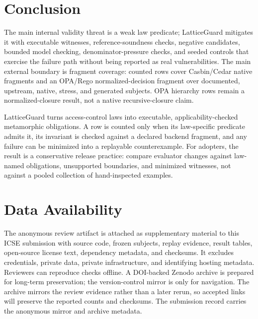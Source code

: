 \documentclass[10pt,conference]{IEEEtran}
\begin{document}
\section{Conclusion}
\label{sec:threats}
The main internal validity threat is a weak law predicate; LatticeGuard mitigates it with executable witnesses, reference-soundness checks, negative candidates, bounded model checking, denominator-pressure checks, and seeded controls that exercise the failure path without being reported as real vulnerabilities.  The main external boundary is fragment coverage: counted rows cover Casbin/Cedar native fragments and an OPA/Rego normalized-decision fragment over documented, upstream, native, stress, and generated subjects.  OPA hierarchy rows remain a normalized-closure result, not a native recursive-closure claim.

LatticeGuard turns access-control laws into executable, applicability-checked metamorphic obligations.  A row is counted only when its law-specific predicate admits it, its invariant is checked against a declared backend fragment, and any failure can be minimized into a replayable counterexample.  For adopters, the result is a conservative release practice: compare evaluator changes against law-named obligations, unsupported boundaries, and minimized witnesses, not against a pooled collection of hand-inspected examples.

\section{Data Availability}
The anonymous review artifact is attached as supplementary material to this ICSE submission with source code, frozen subjects, replay evidence, result tables, open-source license text, dependency metadata, and checksums.  It excludes credentials, private data, private infrastructure, and identifying hosting metadata.  Reviewers can reproduce checks offline.  A DOI-backed Zenodo archive is prepared for long-term preservation; the version-control mirror is only for navigation.  The archive mirrors the review evidence rather than a later rerun, so accepted links will preserve the reported counts and checksums.  The submission record carries the anonymous mirror and archive metadata.



\end{document}
